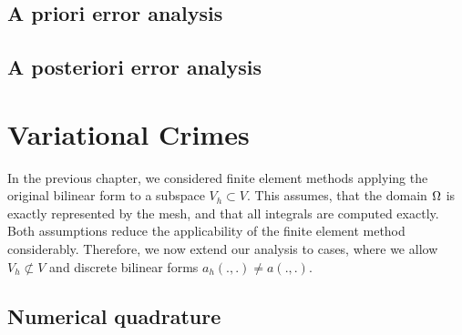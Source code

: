 \section{A priori error analysis}

\section{A posteriori error analysis}


\chapter{Variational Crimes}
\begin{intro}
  In the previous chapter, we considered finite element methods
  applying the original bilinear form to a subspace $V_h\subset
  V$. This assumes, that the domain $\Omega$ is exactly represented
  by the mesh, and that all integrals are computed exactly. Both
  assumptions reduce the applicability of the finite element method
  considerably. Therefore, we now extend our analysis to cases, where
  we allow $V_h \not\subset V$ and discrete bilinear forms
  $a_h(.,.) \neq a(.,.)$.
\end{intro}

\section{Numerical quadrature}


%

%
%



\printindex

